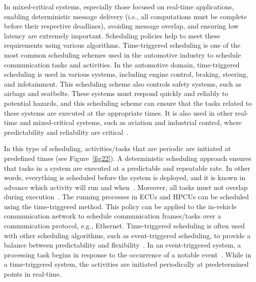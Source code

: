     In mixed-critical systems, especially those focused on real-time applications, enabling deterministic message delivery (i.e., all computations must be complete before their respective deadlines), avoiding message overlap, and ensuring low latency are extremely important. Scheduling policies help to meet these requirements using various algorithms. Time-triggered scheduling is one of the most common scheduling schemes used in the automotive industry to schedule communication tasks and activities. 
    In the automotive domain, time-triggered scheduling is used in various systems, including engine control, braking, steering, and infotainment. This scheduling scheme also controls safety systems, such as airbags and seatbelts. These systems must respond quickly and reliably to potential hazards, and this scheduling scheme can ensure that the tasks related to these systems are executed at the appropriate times. It is also used in other real-time and mixed-critical systems, such as aviation and industrial control, where predictability and reliability are critical~\cite{zeng2010schedule,lukasiewycz2012modular,askaripoor2023designer}.



    In this type of scheduling, activities/tasks that are periodic are initiated at predefined times (see Figure~\ref{fig22}). A deterministic scheduling approach ensures that tasks in a system are executed at a predictable and repeatable rate. In other words, everything is scheduled before the system is deployed, and it is known in advance which activity will run and when~\cite{schild2000scheduling}. Moreover, all tasks must not overlap during execution~\cite{zhang2014task}. The running processes in ECUs and HPCUs can be scheduled using the time-triggered method. This policy can be applied to the in-vehicle communication network to schedule communication frames/tasks over a communication protocol, e.g., Ethernet.
    Time-triggered scheduling is often used with other scheduling algorithms, such as event-triggered scheduling, to provide a balance between predictability and flexibility~\cite{zeng2010schedule}. In an event-triggered system, a processing task begins in response to the occurrence of a notable event~\cite{tabuada2007event}. While in a time-triggered system, the activities are initiated periodically at predetermined points in real-time.




